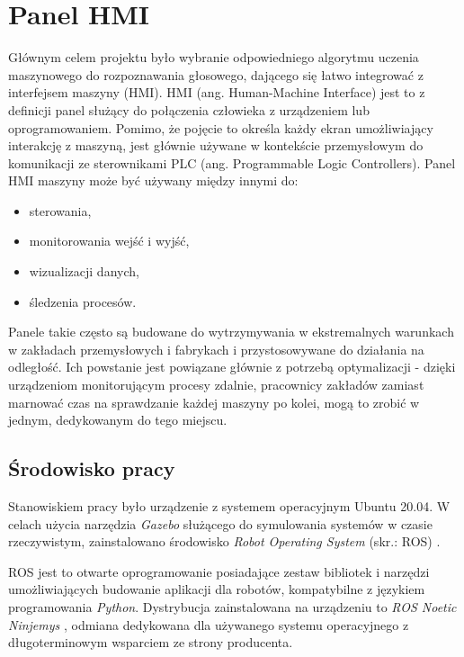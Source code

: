 \chapter{Panel HMI}
\label{cha:panelHmi}

Głównym celem projektu było wybranie odpowiedniego algorytmu uczenia maszynowego do rozpoznawania głosowego, dającego się łatwo integrować z interfejsem maszyny (HMI). HMI (ang. Human-Machine Interface) jest to z definicji panel służący do połączenia człowieka z urządzeniem lub oprogramowaniem. Pomimo, że pojęcie to określa każdy ekran umożliwiający interakcję z maszyną, jest głównie używane w kontekście przemysłowym do komunikacji ze sterownikami PLC (ang. Programmable Logic Controllers). 
Panel HMI maszyny może być używany między innymi do:
\begin{itemize}
    \item sterowania,
    \item monitorowania wejść i wyjść,
    \item wizualizacji danych,
    \item śledzenia procesów.
\end{itemize}
Panele takie często są budowane do wytrzymywania w ekstremalnych warunkach w zakładach przemysłowych i fabrykach i przystosowywane do działania na odległość. Ich powstanie jest powiązane głównie z potrzebą optymalizacji - dzięki urządzeniom monitorującym procesy zdalnie, pracownicy zakładów zamiast marnować czas na sprawdzanie każdej maszyny po kolei, mogą to zrobić w jednym, dedykowanym do tego miejscu. 


\section{Środowisko pracy}
\label{sec:srodPrac}

Stanowiskiem pracy było urządzenie z systemem operacyjnym Ubuntu 20.04. W celach użycia narzędzia \textit{Gazebo} \cite{gazebo} służącego do symulowania systemów w czasie rzeczywistym, zainstalowano środowisko \textit{Robot Operating System} (skr.: ROS) \cite{ros}. 

ROS \cite{ros} jest to otwarte oprogramowanie posiadające zestaw bibliotek i narzędzi umożliwiających budowanie aplikacji dla robotów, kompatybilne z językiem programowania \textit{Python}. Dystrybucja zainstalowana na urządzeniu to \textit{ROS Noetic Ninjemys} \cite{noetic}, odmiana dedykowana dla używanego systemu operacyjnego z długoterminowym wsparciem ze strony producenta. 

